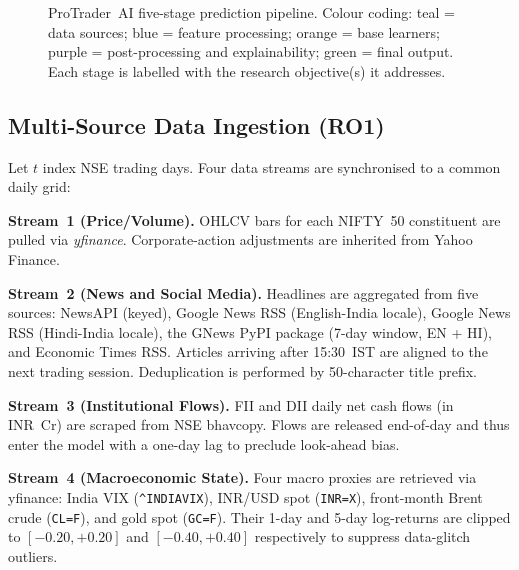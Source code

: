 \begin{figure}[t]
\caption{ProTrader~AI five-stage prediction pipeline. Colour coding: teal =
data sources; blue = feature processing; orange = base learners; purple =
post-processing and explainability; green = final output. Each stage is labelled
with the research objective(s) it addresses.}
\label{fig:arch}
\end{figure}

\subsection{Multi-Source Data Ingestion (RO1)}
\label{subsec:ingest}

Let $t$ index NSE trading days. Four data streams are synchronised to a common
daily grid:

\textbf{Stream~1 (Price/Volume).} OHLCV bars for each NIFTY~50 constituent
are pulled via \emph{yfinance}. Corporate-action adjustments are inherited from
Yahoo Finance.

\textbf{Stream~2 (News and Social Media).} Headlines are aggregated from five
sources: NewsAPI (keyed), Google News RSS (English-India locale), Google News
RSS (Hindi-India locale), the GNews PyPI package (7-day window, EN + HI), and
Economic Times RSS. Articles arriving after 15:30~IST are aligned to the next
trading session. Deduplication is performed by 50-character title prefix.

\textbf{Stream~3 (Institutional Flows).} FII and DII daily net cash flows
(in INR~Cr) are scraped from NSE bhavcopy. Flows are released end-of-day and
thus enter the model with a one-day lag to preclude look-ahead bias.

\textbf{Stream~4 (Macroeconomic State).} Four macro proxies are retrieved via
yfinance: India VIX (\texttt{\^{}INDIAVIX}), INR/USD spot (\texttt{INR=X}),
front-month Brent crude (\texttt{CL=F}), and gold spot (\texttt{GC=F}). Their
1-day and 5-day log-returns are clipped to $[-0.20,+0.20]$ and $[-0.40,+0.40]$
respectively to suppress data-glitch outliers.

